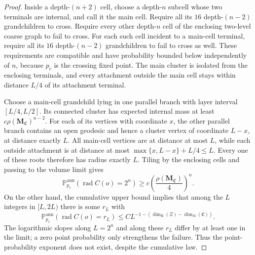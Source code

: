 \documentclass[scheme=plain,11pt]{ctexart}
\theoremstyle{definition}
\theoremstyle{remark}
\newcommand{\dimhaus}{\dim_{\mathrm H}}
\newcommand{\dimmass}{\dim_{\mathrm M}}
\begin{document}
\begin{proof}
Inside a depth-$(n+2)$ cell, choose a depth-$n$ subcell whose two terminals are internal, and call it the main cell.
Require all its $16$ depth-$(n-2)$ grandchildren to cross.
Require every other depth-$n$ cell of the enclosing two-level coarse graph to fail to cross.
For each such cell incident to a main-cell terminal, require all its $16$ depth-$(n-2)$ grandchildren to fail to cross as well.
These requirements are compatible and have probability bounded below independently of $n$, because $p_c$ is the crossing fixed point.
The main cluster is isolated from the enclosing terminals, and every attachment outside the main cell stays within distance $L/4$ of its attachment terminal.

Choose a main-cell grandchild lying in one parallel branch with layer interval $[L/4,L/2]$.
Its connected cluster has expected internal mass at least $c\rho(\mathbf M_{\mathfrak C})^{n-2}$.
For each of its vertices with coordinate $x$, the other parallel branch contains an open geodesic and hence a cluster vertex of coordinate $L-x$, at distance exactly $L$.
All main-cell vertices are at distance at most $L$, while each outside attachment is at distance at most
$\max\{x,L-x\}+L/4\le L$.
Every one of these roots therefore has radius exactly $L$.
Tiling by the enclosing cells and passing to the volume limit gives
\begin{equation}\label{eq:diamond-radius-spikes}
 \mathbb P_{p_c}^{\mathrm{ann}}(\operatorname{rad}C(o)=2^n)
 \ge c\left(\frac{\rho(\mathbf M_{\mathfrak C})}{4}\right)^n.
\end{equation}
On the other hand, the cumulative upper bound implies that among the $L$ integers in $[L,2L)$ there is some $r_L$ with
\[
 \mathbb P_{p_c}^{\mathrm{ann}}(\operatorname{rad}C(o)=r_L)
 \le CL^{-1-(\dimhaus(\Xi)-\dimmass(\mathfrak C))}.
\]
The logarithmic slopes along $L=2^n$ and along these $r_L$ differ by at least one in the limit; a zero point probability only strengthens the failure.
Thus the point-probability exponent does not exist, despite the cumulative law.
\end{proof}



\end{document}
